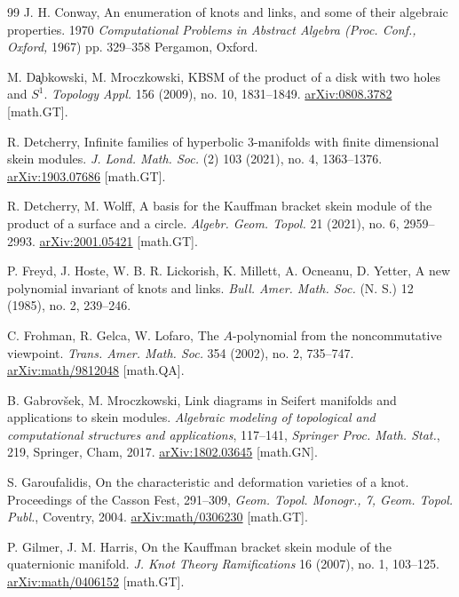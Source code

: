 \documentclass[12pt]{amsproc}
\begin{document}
\begin{thebibliography}{99}
J. H. Conway, An enumeration of knots and links, and some of their algebraic properties. 1970 {\it Computational Problems in Abstract Algebra (Proc. Conf., Oxford,} 1967) pp. 329–358 Pergamon, Oxford.


M. D\c{a}bkowski, M. Mroczkowski,
KBSM of the product of a disk with two holes and $S^1$.
{\it Topology Appl.} 156 (2009), no. 10, 1831–1849. \href{https://arxiv.org/abs/0808.3782}{arXiv:0808.3782} [math.GT].

R. Detcherry, Infinite families of hyperbolic $3$-manifolds with finite dimensional skein modules. {\it J. Lond. Math. Soc.} (2) 103 (2021), no. 4, 1363–1376.  \href{https://arxiv.org/abs/1903.07686}{arXiv:1903.07686} [math.GT].

R. Detcherry, M. Wolff, A basis for the Kauffman bracket skein module of the product of a surface and a circle. {\it Algebr. Geom. Topol.} 21 (2021), no. 6, 2959–2993.  \href{https://arxiv.org/abs/2001.05421}{arXiv:2001.05421} [math.GT].

P. Freyd,  J. Hoste, W. B. R. Lickorish, K. Millett, A.  Ocneanu, D. Yetter,
A new polynomial invariant of knots and links. {\it Bull. Amer. Math. Soc.} (N. S.) 12 (1985), no. 2, 239–246. 

C. Frohman, R. Gelca, W. Lofaro,
The $A$-polynomial from the noncommutative viewpoint. 
{\it Trans. Amer. Math. Soc.} 354 (2002), no. 2, 735–747. \href{https://arxiv.org/abs/math/9812048}{arXiv:math/9812048} [math.QA].

B. Gabrovšek, M. Mroczkowski,
Link diagrams in Seifert manifolds and applications to skein modules. {\it Algebraic modeling of topological and computational structures and applications}, 117–141, {\it Springer Proc. Math. Stat.}, 219, Springer, Cham, 2017. \href{https://arxiv.org/abs/1802.03645}{arXiv:1802.03645} [math.GN].

S. Garoufalidis, 
On the characteristic and deformation varieties of a knot. Proceedings of the Casson Fest, 291–309, 
{\it Geom. Topol. Monogr., 7, Geom. Topol. Publ.}, Coventry, 2004. \href{https://arxiv.org/abs/math/0306230}{arXiv:math/0306230} [math.GT].

P. Gilmer, J. M. Harris, On the Kauffman bracket skein module of the quaternionic manifold. {\it J. Knot Theory Ramifications} 16 (2007), no. 1, 103–125. \href{https://arxiv.org/abs/math/0406152}{arXiv:math/0406152} [math.GT].


\end{thebibliography}
\end{document}
